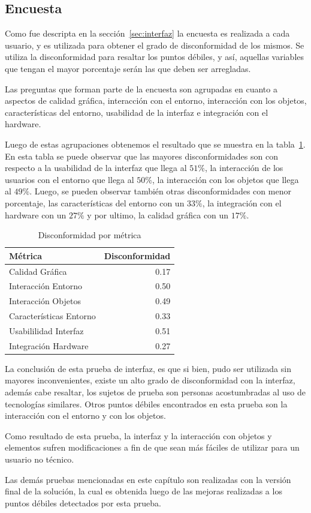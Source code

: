\subsection{Encuesta}

Como fue descripta en la sección~\ref{sec:interfaz} la encuesta es realizada a
cada usuario, y es utilizada para obtener el grado de disconformidad de los
mismos. Se utiliza la disconformidad para resaltar los puntos débiles, y así,
aquellas variables que tengan el mayor porcentaje serán las que deben ser
arregladas.

Las preguntas que forman parte de la  encuesta son agrupadas en cuanto a
aspectos de calidad gráfica, interacción con el entorno, interacción con los
objetos, características del entorno, usabilidad de la interfaz e integración
con el hardware.

Luego de estas agrupaciones obtenemos el resultado que se muestra en la
tabla~\ref{tab:interfaz_disconformidad_metrica}. En esta tabla se puede observar
que las mayores disconformidades son con respecto a la usabilidad de la interfaz
que llega al $51\%$, la interacción de los usuarios con el entorno que llega al
$50\%$, la interacción con los objetos que llega al $49\%$. Luego, se pueden
observar también otras disconformidades con menor porcentaje, las
características del entorno con un  $33\%$, la integración con el hardware con
un  $27\%$ y por ultimo, la calidad gráfica con un  $17\%$.

\begin{table}[H]
\centering
\begin{tabular}{lr}
\toprule
Métrica & Disconformidad \\
\midrule
Calidad Gráfica         & 0.17 \\
Interacción Entorno     & 0.50\\
Interacción Objetos     & 0.49\\
Características Entorno & 0.33\\
Usabililidad Interfaz   & 0.51\\
Integración Hardware    & 0.27\\
\bottomrule
\end{tabular}
\caption{Disconformidad por métrica}
\label{tab:interfaz_disconformidad_metrica}
\end{table}

La conclusión de esta prueba de interfaz, es que si bien, pudo ser utilizada sin
mayores inconvenientes, existe un alto grado de disconformidad con la interfaz,
además cabe resaltar, los sujetos de prueba son personas acostumbradas al uso de
tecnologías similares. Otros puntos débiles encontrados en esta prueba son la
interacción con el entorno y  con los objetos.

Como resultado de esta prueba, la interfaz y la interacción con objetos y
elementos sufren modificaciones a fin de que sean más fáciles de utilizar para
un usuario no técnico.

Las demás pruebas mencionadas en este capítulo son realizadas con la versión
final de la solución, la cual es obtenida luego de las mejoras realizadas a los
puntos débiles detectados por esta prueba.

